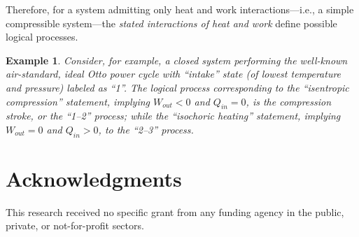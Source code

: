 \documentclass[10pt,a4paper]{article}
\newtheorem{example}{Example}
\begin{document}
    Therefore, for  a  system  admitting  only  heat  and  work  interactions---i.e.,  a  simple
    compressible system---the \emph{stated  interactions  of  heat  and  work}  define  possible
    logical processes.

    \begin{example}\label{ex:ideal.Otto}
        Consider, for example, a closed system performing  the  well-known  air-standard,  ideal
        Otto power cycle with ``intake'' state (of lowest temperature and pressure)  labeled  as
        ``1''. The logical process corresponding to the  ``isentropic  compression''  statement,
        implying $W_{out} < 0$ and $Q_{in} = 0$, is the  compression  stroke,  or  the  ``1--2''
        process; while the ``isochoric heating'' statement, implying $W_{out} = 0$ and $Q_{in} >
        0$, to the ``2--3'' process.
    \end{example}

\section*{Acknowledgments}

    This research received no specific grant from any funding agency in the public, private,  or
    not-for-profit sectors.





\end{document}
